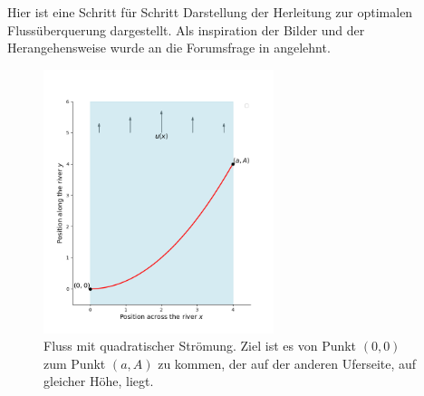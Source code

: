 











Hier ist eine Schritt für Schritt Darstellung der Herleitung zur optimalen Flussüberquerung dargestellt. Als inspiration der Bilder und der Herangehensweise wurde an die Forumsfrage in \cite{schwimmen:mathForum} angelehnt. 

\begin{figure}
    \centering
        \centering
        \includegraphics[width=0.6\textwidth]{papers/schwimmen/Grafiken/Figure_1.png}	
        \caption{Fluss mit quadratischer Strömung. Ziel ist es von Punkt \((0,0)\) zum Punkt \((a,A)\) zu kommen, der auf der anderen Uferseite, auf gleicher Höhe, liegt.}
        \label{fig:river_template}
\end{figure}

